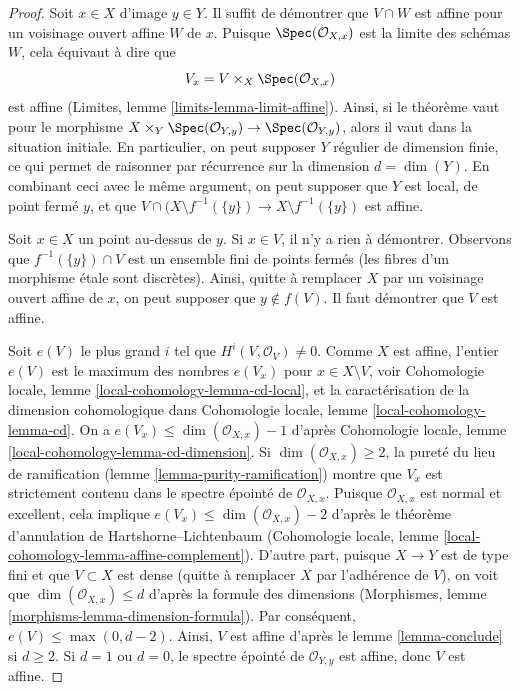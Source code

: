 \begin{proof}
Soit $x \in X$ d'image $y \in Y$. Il suffit de démontrer que
$V \cap W$ est affine pour un voisinage ouvert affine $W$ de $x$.
Puisque $\Spec(\mathcal{O}_{X, x})$ est la limite des schémas $W$,
cela équivaut à dire que
$$
V_x = V \times_X \Spec(\mathcal{O}_{X, x})
$$
est affine (Limites, lemme \ref{limits-lemma-limit-affine}).
Ainsi, si le théorème vaut pour le morphisme
$X \times_Y \Spec(\mathcal{O}_{Y, y}) \to \Spec(\mathcal{O}_{Y, y})$,
alors il vaut dans la situation initiale. En particulier, on peut supposer $Y$
régulier de dimension finie, ce qui permet de raisonner par récurrence
sur la dimension $d = \dim(Y)$. En combinant ceci avec le même argument,
on peut supposer que $Y$ est local, de point fermé $y$, et que
$V \cap (X \setminus f^{-1}(\{y\}) \to X \setminus f^{-1}(\{y\})$
est affine.

\medskip\noindent
Soit $x \in X$ un point au-dessus de $y$. Si $x \in V$, il n'y a
rien à démontrer. Observons que $f^{-1}(\{y\}) \cap V$
est un ensemble fini de points fermés (les fibres d'un morphisme \'etale
sont discrètes). Ainsi, quitte à remplacer $X$
par un voisinage ouvert affine de $x$, on peut supposer que
$y \not \in f(V)$. Il faut démontrer que $V$ est affine.

\medskip\noindent
Soit $e(V)$ le plus grand $i$ tel que $H^i(V, \mathcal{O}_V) \not = 0$.
Comme $X$ est affine, l'entier $e(V)$ est le maximum des nombres $e(V_x)$
pour $x \in X \setminus V$, voir
Cohomologie locale, lemme \ref{local-cohomology-lemma-cd-local},
et la caractérisation de la dimension cohomologique dans
Cohomologie locale, lemme \ref{local-cohomology-lemma-cd}.
On a $e(V_x) \leq \dim(\mathcal{O}_{X, x}) - 1$ d'après
Cohomologie locale, lemme \ref{local-cohomology-lemma-cd-dimension}.
Si $\dim(\mathcal{O}_{X, x}) \geq 2$, la pureté du
lieu de ramification (lemme \ref{lemma-purity-ramification})
montre que $V_x$ est strictement contenu dans le spectre épointé de
$\mathcal{O}_{X, x}$. Puisque $\mathcal{O}_{X, x}$ est
normal et excellent, cela implique
$e(V_x) \leq \dim(\mathcal{O}_{X, x}) - 2$ d'après le théorème
d'annulation de Hartshorne--Lichtenbaum
(Cohomologie locale, lemme \ref{local-cohomology-lemma-affine-complement}).
D'autre part, puisque $X \to Y$ est de type fini
et que $V \subset X$ est dense (quitte à remplacer $X$
par l'adhérence de $V$), on voit que $\dim(\mathcal{O}_{X, x}) \leq d$
d'après la formule des dimensions
(Morphismes, lemme \ref{morphisms-lemma-dimension-formula}).
Par conséquent, $e(V) \leq \max(0, d -  2)$.
Ainsi, $V$ est affine d'après le lemme \ref{lemma-conclude}
si $d \geq 2$. Si $d = 1$ ou $d = 0$, le spectre épointé de
$\mathcal{O}_{Y, y}$ est affine, donc $V$ est affine.
\end{proof}




